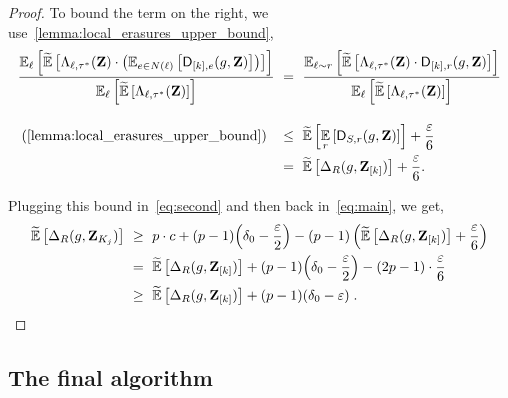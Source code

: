\begin{proof}
		
To bound the term on the right, we use~\cref{lemma:local_erasures_upper_bound},			\begin{align*}
				\frac{\Ex{\li}{\tildeEx{\Lambda_{\li, \tau^*}(\zee) \cdot \inparen{\Ex{e\in N(\li)}{\dd_{[k],e}(g,\zee)} } }}}{\Ex{\li}{\tildeEx{\Lambda_{\li,\tau^*}(\zee)}}} ~&=~ \frac{\Ex{\li\sim \ri}{\tildeEx{\Lambda_{\li, \tau^*}(\zee) \cdot \dd_{[k],\ri}(g,\zee)  }}}{\Ex{\li}{\tildeEx{\Lambda_{\li,\tau^*}(\zee)}}}\\[1em]
\text{(\cref{lemma:local_erasures_upper_bound})}\;\;				~&\leq~  \tildeEx{\Ex{\ri}{\dd_{S,\ri}(g,\zee)}} + \frac{\eps}{6}\\
				~&=~	\tildeEx{\Delta_R(g,\zee_{[k]})} + \frac{\eps}{6}.  
				\end{align*}

Plugging this bound in~\cref{eq:second} and then back in~\cref{eq:main},  we get,		
\begin{align*}	
		\tildeEx{\Delta_R(g,\zee_{K_j})}  ~&\geq~ p\cdot c + (p-1)\parens[\Big]{\delta_0 - \frac{\eps}{2}} -  (p-1) \inparen{\tildeEx{\Delta_R(g,\zee_{[k]})} + \frac{\eps}{6}}\\
		~&=~ \tildeEx{\Delta_R(g,\zee_{[k]})}  +(p-1)\parens[\Big]{\delta_0 - \frac{\eps}{2}} - (2p-1)\cdot \frac{\eps}{6} \\
		~&\geq~ \tildeEx{\Delta_R(g,\zee_{[k]})}  + (p-1)(\delta_0 - \eps) \;. \qedhere
		\end{align*}
\end{proof}




\subsection{The final algorithm}\label{sec:sos_algo}


